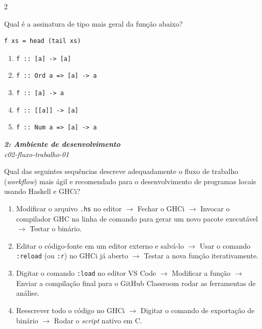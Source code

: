 \documentclass[a4paper,10pt,brazil]{article}
\begin{document}
\begin{multicols}{2}
\begin{flushright}
\end{flushright}
Qual é a assinatura de tipo mais geral da função abaixo?

\begin{verbatim}
f xs = head (tail xs)
\end{verbatim}

\begin{enumerate}
  \item \texttt{f :: [a] -> [a]}
  \item \texttt{f :: Ord a => [a] -> a}
  \item \texttt{f :: [a] -> a}
  \item \texttt{f :: [[a]] -> [a]}
  \item \texttt{f :: Num a => [a] -> a}

\end{enumerate}

\begin{flushright}
  \footnotesize
  \textit{\textbf{2: Ambiente de desenvolvimento}}\\
  \textit{c02-fluxo-trabalho-01}\\

\end{flushright}
Qual das seguintes sequências descreve adequadamente o fluxo de trabalho (\emph{workflow}) mais ágil e recomendado para o desenvolvimento de programas locais usando Haskell e GHCi?

\begin{enumerate}
  \item Modificar o arquivo \texttt{.hs} no editor $\rightarrow$ Fechar o GHCi $\rightarrow$ Invocar o compilador GHC na linha de comando para gerar um novo pacote executável $\rightarrow$ Testar o binário.

  \item Editar o código-fonte em um editor externo e salvá-lo $\rightarrow$ Usar o comando \texttt{:reload} (ou \texttt{:r}) no GHCi já aberto $\rightarrow$ Testar a nova função iterativamente.

  \item Digitar o comando \texttt{:load} no editor VS Code $\rightarrow$ Modificar a função $\rightarrow$ Enviar a compilação final para o GitHub Classroom rodar as ferramentas de análise.

  \item Reescrever todo o código no GHCi $\rightarrow$ Digitar o comando de exportação de binário $\rightarrow$ Rodar o \emph{script} nativo em C.


\end{enumerate}
\end{multicols}
\end{document}
